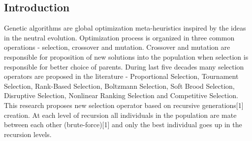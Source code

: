 \documentclass[a0,portrait,25pt]{sciposter}
\begin{document}
\begin{mdframed}[backgroundcolor=white,roundcorner=4pt,shadow=true,linewidth=1pt]
\color{Black}

\section*{Introduction}
Genetic algorithms are global optimization meta-heuristics inspired by the ideas in the neutral evolution. Optimization process is organized in three common operations - selection, crossover and mutation. Crossover and mutation are responsible for proposition of new solutions into the population when selection is responsible for better choice of parents. During last five decades many selection operators are proposed in the literature - Proportional Selection, Tournament Selection, Rank-Based Selection, Boltzmann Selection, Soft Brood Selection, Disruptive Selection, Nonlinear Ranking Selection and Competitive Selection. This research proposes new selection operator based on recursive generations[1] creation. At each level of recursion all individuals in the population are mate between each other (brute-force)[1] and only the best individual goes up in the recursion levels.
\end{mdframed}
\end{document}
